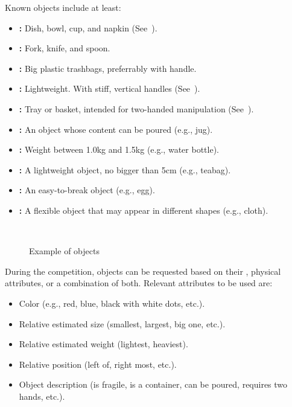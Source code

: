 Known objects include at least:
\begin{itemize}
	\item \textbf{:} Dish, bowl, cup, and napkin (See~).
	\item \textbf{:} Fork, knife, and spoon.
	\item \textbf{:} Big plastic trashbags, preferrably with handle.
	\item \textbf{:} Lightweight. With stiff, vertical handles (See~).
	\item \textbf{:} Tray or basket, intended for two-handed manipulation (See~).
	\item \textbf{:} An object whose content can be poured (e.g., jug).
	\item \textbf{:} Weight between 1.0kg and 1.5kg (e.g., water bottle).
	\item \textbf{:} A lightweight object, no bigger than 5cm (e.g., teabag).
	\item \textbf{:} An easy-to-break object (e.g., egg).
	\item \textbf{:} A flexible object that may appear in different shapes (e.g., cloth).
\end{itemize}

\begin{figure}[H]
	\centering
	~
	~
	\caption{Example of objects}
	\label{fig:scenario_containers}
\end{figure}

\noindent During the competition, objects can be requested based on their \ObjectCategory{}, physical attributes, or a combination of both.
Relevant attributes to be used are:
\begin{itemize}
	\item Color (e.g., red, blue, black with white dots, etc.).
	\item Relative estimated size (smallest, largest, big one, etc.).
	\item Relative estimated weight (lightest, heaviest).
	\item Relative position (left of, right most, etc.).
	\item Object description (is fragile, is a container, can be poured, requires two hands, etc.).
\end{itemize}

